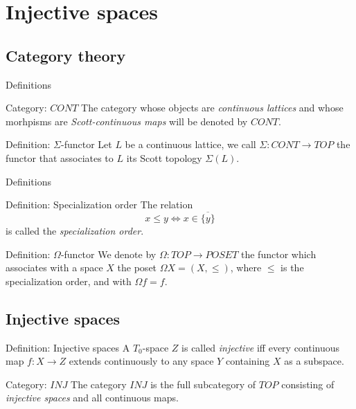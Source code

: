 \documentclass{beamer}
\begin{document}
\section{Injective spaces}
\subsection{Category theory}
\begin{frame}{Definitions}
\begin{block}{Category: $CONT$}
The category whose objects are \emph{continuous lattices} and whose morhpisms are \emph{Scott-continuous maps} will be denoted by $CONT$.
\end{block}

\begin{block}{Definition: $\Sigma$-functor}
Let $L$ be a continuous lattice, we call $\Sigma: CONT \rightarrow TOP$ the functor that associates to $L$ its Scott topology $\Sigma(L)$.
\end{block}

\end{frame}
\begin{frame}{Definitions}
\begin{block}{Definition: Specialization order}
The relation $$x\leq y \Longleftrightarrow x \in \overline{\{y\}}$$
is called the \emph{specialization order}.
\end{block}

\begin{block}{Definition: $\Omega$-functor}
We denote by $\Omega: TOP \to POSET$ the functor which associates with a space $X$ the poset $\Omega X = (X, \leq)$, where $\leq$ is the specialization order, and with $\Omega f = f$.
\end{block}

\end{frame}
\subsection{Injective spaces}
\begin{frame}
\begin{block}{Definition: Injective spaces}
A $T_0$-space $Z$ is called \emph{injective} iff every continuous map $f: X \rightarrow Z$ extends continuously to any space $Y$ containing $X$ as a subspace.
 \begin{center}
 \end{center}
\end{block}

\begin{block}{Category: $INJ$}
The category $INJ$ is the full subcategory of $TOP$ consisting of \emph{injective spaces} and all continuous maps.
\end{block}
\end{frame}
\end{document}
